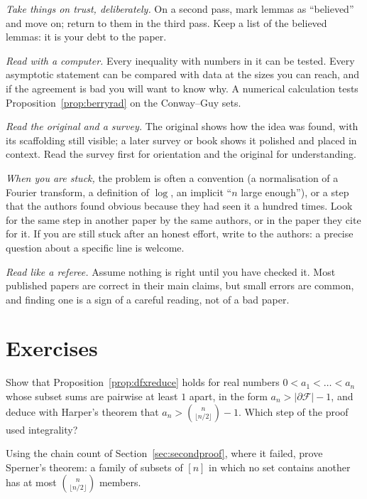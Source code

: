 \emph{Take things on trust, deliberately.} On a second pass, mark lemmas as ``believed'' and move on; return to them in the third pass. Keep a list of the
believed lemmas: it is your debt to the paper.

\emph{Read with a computer.} Every inequality with numbers in it can be tested. Every asymptotic statement can be compared with data at the sizes you
can reach, and if the agreement is bad you will want to know why. A numerical calculation tests Proposition~\ref{prop:berryrad} on the Conway--Guy sets.

\emph{Read the original and a survey.} The original shows how the idea was found, with its scaffolding still visible; a later survey or book shows it
polished and placed in context. Read the survey first for orientation and the original for understanding.

\emph{When you are stuck,} the problem is often a convention (a normalisation of a Fourier transform, a definition of $\log$, an implicit ``$n$ large enough''), or a
step that the authors found obvious because they had seen it a hundred times. Look for the same step in another paper by the same authors, or in the
paper they cite for it. If you are still stuck after an honest effort, write to the authors: a precise question about a specific line is welcome.

\emph{Read like a referee.} Assume nothing is right until you have checked it. Most published papers are correct in their main claims, but small errors
are common, and finding one is a sign of a careful reading, not of a bad paper.

\section{Exercises}

\begin{exercise}[$\star$]\label{ex:realdfx}
Show that Proposition~\ref{prop:dfxreduce} holds for real numbers $0<a_1<\dots<a_n$ whose subset sums are pairwise at least $1$ apart, in the form $a_n>|\partial\mathcal F|-1$, and deduce with
Harper's theorem that $a_n>\binom n{\lfloor n/2\rfloor}-1$. Which step of the proof used integrality?
\end{exercise}

\begin{exercise}[$\star$]\label{ex:sperner}
Using the chain count of Section~\ref{sec:secondproof}, where it failed, prove Sperner's theorem: a family of subsets of $[n]$ in which no set contains another has at most $\binom n{\lfloor n/2\rfloor}$ members.
\end{exercise}

